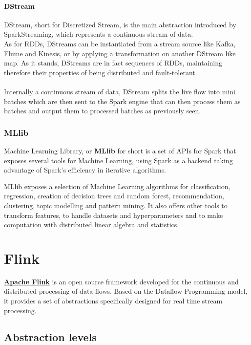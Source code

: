 \paragraph{DStream}

DStream, short for Discretized Stream, is the main abstraction introduced by SparkStreaming, which represents a continuous stream of data. \\
As for RDDs, DStreams can be instantiated from a stream source like Kafka, Flume and Kinesis, or by applying a transformation on another DStream like map. As it stands, DStreams are in fact sequences of RDDs, maintaining therefore their properties of being distributed and fault-tolerant.
\\ \\
Internally a continuous stream of data, DStream splits the live flow into mini batches which are then sent to the Spark engine that can then process them as batches and output them to processed batches as previously seen.

\subsubsection{MLlib}

Machine Learning Library, or \textbf{MLlib} for short is a set of APIs for Spark that exposes several tools for Machine Learning, using Spark as a backend taking advantage of Spark's efficiency in iterative algorithms.

MLlib exposes a selection of Machine Learning algorithms for classification, regression, creation of decision trees and random forest, recommendation, clustering, topic modelling and pattern mining.
It also offers other tools to transform features, to handle datasets and hyperparameters and to make computation with distributed linear algebra and statistics.

\pagebreak
\section{Flink}\label{Flink}

\href{https://flink.apache.org/}{\textbf{Apache Flink}} \cite{flink_doc} is an open source framework developed for the continuous and distributed processing of data flows. Based on the Dataflow Programming model, it provides a set of abstractions specifically designed for real time stream processing.

\subsection{Abstraction levels}  \label{AbstractionLevels}

